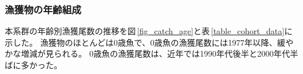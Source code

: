 \subsubsection{漁獲物の年齢組成}
本系群の年齢別漁獲尾数の推移を図\,\ref{fig_catch_age}と表\,\ref{table_cohort_data}に示した。
漁獲物のほとんどは0歳魚で、0歳魚の漁獲尾数には1977年以降、緩やかな増減が見られる。
0歳魚の漁獲尾数は、近年では1990年代後半と2000年代半ばに多かった。
